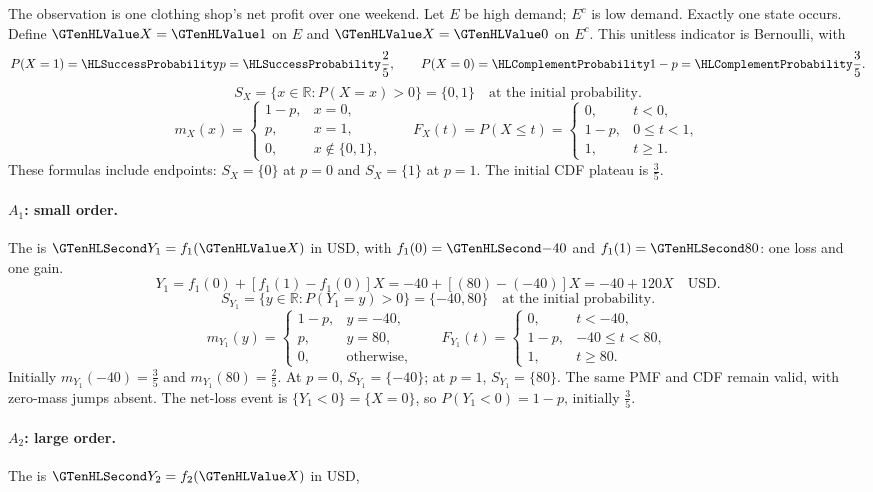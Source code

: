 The observation is one clothing shop's net profit over one weekend. Let $E$ be high demand; $E^c$ is low demand. Exactly one state occurs. Define $\Indicator{X}=\Indicator{1}$ on $E$ and $\Indicator{X}=\Indicator{0}$ on $E^c$. This unitless indicator is Bernoulli, with
\[P(X=1)=\SuccessProb{p}=\SuccessProb{\frac{2}{5}},\qquad P(X=0)=\FailureProb{1-p}=\FailureProb{\frac{3}{5}}.\]
\[S_X=\{x\in\mathbb R:P(X=x)>0\}=\{0,1\}\quad\text{at the initial probability}.\]
\[m_X(x)=\begin{cases}1-p,&x=0,\\p,&x=1,\\0,&x\notin\{0,1\},\end{cases}\qquad F_X(t)=P(X\leq t)=\begin{cases}0,&t<0,\\1-p,&0\leq t<1,\\1,&t\geq1.\end{cases}\]
These formulas include endpoints: $S_X=\{0\}$ at $p=0$ and $S_X=\{1\}$ at $p=1$. The initial CDF plateau is $\frac{3}{5}$.
\paragraph{$A_1$: small order.}
The  is $\Money{Y_1}=f_1(\Indicator{X})$ in USD,
with $f_1(0)=\Money{-40}$ and $f_1(1)=\Money{80}$: one loss and one gain.
\[
Y_1=f_1(0)+[f_1(1)-f_1(0)]X=-40+[(80)-(-40)]X=-40+120X\quad\text{USD}.
\]
\[S_{Y_1}=\{y\in\mathbb R:P(Y_1=y)>0\}=\{-40,80\}\quad\text{at the initial probability}.\]
\[
m_{Y_1}(y)=\begin{cases}1-p,&y=-40,\\p,&y=80,\\0,&\text{otherwise},\end{cases}
\qquad F_{Y_1}(t)=\begin{cases}0,&t<-40,\\1-p,&-40\leq t<80,\\1,&t\geq 80.\end{cases}
\]
Initially $m_{Y_1}(-40)=\frac{3}{5}$ and $m_{Y_1}(80)=\frac{2}{5}$.
At $p=0$, $S_{Y_1}=\{-40\}$; at $p=1$, $S_{Y_1}=\{80\}$.
The same PMF and CDF remain valid, with zero-mass jumps absent.
The net-loss event is $\{Y_1<0\}=\{X=0\}$, so $P(Y_1<0)=1-p$,
initially $\frac{3}{5}$.
\paragraph{$A_2$: large order.}
The  is $\Money{Y_2}=f_2(\Indicator{X})$ in USD,
